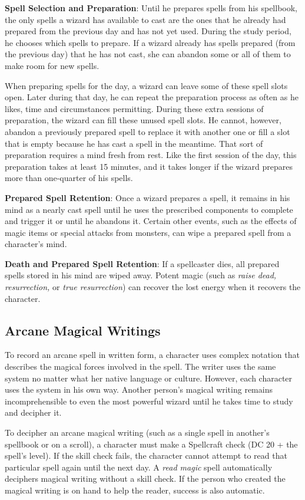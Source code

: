 \textbf{Spell Selection and Preparation}: Until he prepares spells from his spellbook, the only spells a wizard has available to cast are the ones that he already had prepared from the previous day and has not yet used. During the study period, he chooses which spells to prepare. If a wizard already has spells prepared (from the previous day) that he has not cast, she can abandon some or all of them to make room for new spells.
				
When preparing spells for the day, a wizard can leave some of these spell slots open. Later during that day, he can repeat the preparation process as often as he likes, time and circumstances permitting. During these extra sessions of preparation, the wizard can fill these unused spell slots. He cannot, however, abandon a previously prepared spell to replace it with another one or fill a slot that is empty because he has cast a spell in the meantime. That sort of preparation requires a mind fresh from rest. Like the first session of the day, this preparation takes at least 15 minutes, and it takes longer if the wizard prepares more than one-quarter of his spells.
				
\textbf{Prepared Spell Retention}: Once a wizard prepares a spell, it remains in his mind as a nearly cast spell until he uses the prescribed components to complete and trigger it or until he abandons it. Certain other events, such as the effects of magic items or special attacks from monsters, can wipe a prepared spell from a character's mind.
				
\textbf{Death and Prepared Spell Retention}: If a spellcaster dies, all prepared spells stored in his mind are wiped away. Potent magic (such as \textit{raise dead, resurrection, }or \textit{true resurrection}) can recover the lost energy when it recovers the character.
				
\subsection{Arcane Magical Writings}

				
To record an arcane spell in written form, a character uses complex notation that describes the magical forces involved in the spell. The writer uses the same system no matter what her native language or culture. However, each character uses the system in his own way. Another person's magical writing remains incomprehensible to even the most powerful wizard until he takes time to study and decipher it.
				
To decipher an arcane magical writing (such as a single spell in another's spellbook or on a scroll), a character must make a Spellcraft check (DC 20 + the spell's level). If the skill check fails, the character cannot attempt to read that particular spell again until the next day. A \textit{read magic }spell automatically deciphers magical writing without a skill check. If the person who created the magical writing is on hand to help the reader, success is also automatic.
				
